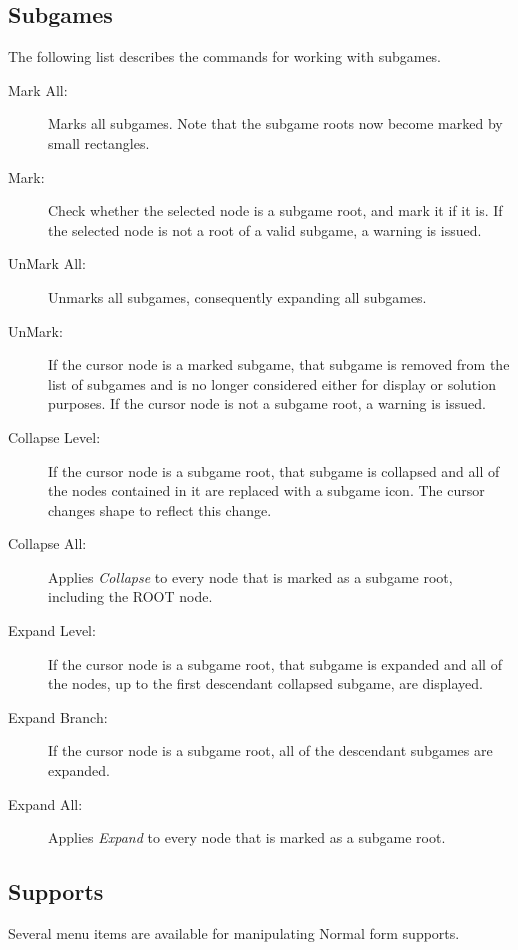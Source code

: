 \subsection{Subgames}\label{SubgamesMenu}

The following list describes the commands for working with subgames. 

\begin{description}
\item[Mark All:] Marks all subgames.  Note that the subgame roots now
become marked by small rectangles.
\item[Mark:] Check whether the selected node is a subgame root, and mark
it if it is.  If the selected node is not a root of a valid subgame, a
warning is issued.
\item[UnMark All:] Unmarks all subgames, consequently expanding all
subgames.
\item[UnMark:] If the cursor node is a marked subgame, that subgame is
removed from the list of subgames and is no longer considered either
for display or solution purposes.  If the cursor node is not a subgame
root, a warning is issued.
\item[Collapse Level:] If the cursor node is a subgame root, that
subgame is collapsed and all of the nodes contained in it are replaced
with a subgame icon.  The cursor changes shape to reflect this change.
\item[Collapse All:] Applies {\em Collapse} to every node that is
marked as a subgame root, including the ROOT node.
\item[Expand Level:] If the cursor node is a subgame root, that
subgame is expanded and all of the nodes, up to the first descendant
collapsed subgame, are displayed.
\item[Expand Branch:] If the cursor node is a subgame root, all of the
descendant subgames are expanded.
\item[Expand All:] Applies {\em Expand} to every node that is marked
as a subgame root.
\end{description}

\subsection{Supports}\label{efsupport}

Several menu items are available for manipulating Normal form supports.  

